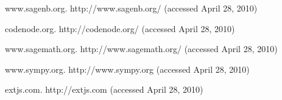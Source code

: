 
\begin{thebibliography}{10}
{\sc www.sagenb.org}. {http://www.sagenb.org/} (accessed April 28, 2010)

{\sc codenode.org}. {http://codenode.org/} (accessed April 28, 2010)

{\sc www.sagemath.org}. {http://www.sagemath.org/} (accessed April 28, 2010)

{\sc www.sympy.org}. {http://www.sympy.org} (accessed April 28, 2010)

{\sc extjs.com}. {http://extjs.com} (accessed April 28, 2010)
\end{thebibliography}